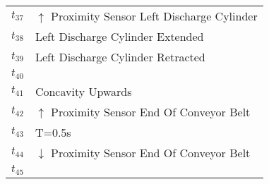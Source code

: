 \begin{table}[H]
\begin{tabular}{M{5cm}M{10cm}}
\hyperlink{partialNet:t37}{\hypertarget{partialTable:t37}{$t_{37}$}} & \(\uparrow\) Proximity Sensor Left Discharge Cylinder\\
\hyperlink{partialNet:t38}{\hypertarget{partialTable:t38}{$t_{38}$}} & Left Discharge Cylinder Extended\\
\hyperlink{partialNet:t39}{\hypertarget{partialTable:t39}{$t_{39}$}} & Left Discharge Cylinder Retracted\\
\hyperlink{partialNet:t40}{\hypertarget{partialTable:t40}{$t_{40}$}} & \\
\hyperlink{partialNet:t41}{\hypertarget{partialTable:t41}{$t_{41}$}} & Concavity Upwards\\
\hyperlink{partialNet:t42}{\hypertarget{partialTable:t42}{$t_{42}$}} & \(\uparrow\) Proximity Sensor End Of Conveyor Belt\\
\hyperlink{partialNet:tt43}{\hypertarget{partialTable:tt43}{$t_{43}$}} & T=0.5s\\
\hyperlink{partialNet:t44}{\hypertarget{partialTable:t44}{$t_{44}$}} & \(\downarrow\) Proximity Sensor End Of Conveyor Belt\\
\hyperlink{partialNet:t45}{\hypertarget{partialTable:t45}{$t_{45}$}} & \\
\end{tabular}
\end{table}

